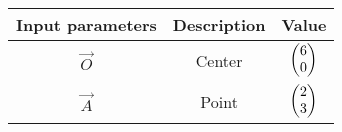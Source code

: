     \begin{tabular}{|c|c|c|}
    \hline
         \textbf{Input parameters}& \textbf{Description}&\textbf{Value} \\
         \hline
        $\vec{O}$ & Center&$\begin{pmatrix}6\\0\end{pmatrix}$ \\
        \hline
       $\vec{A}$&Point &$\begin{pmatrix}2\\3\end{pmatrix}$ \\
       \hline
    \end{tabular}
